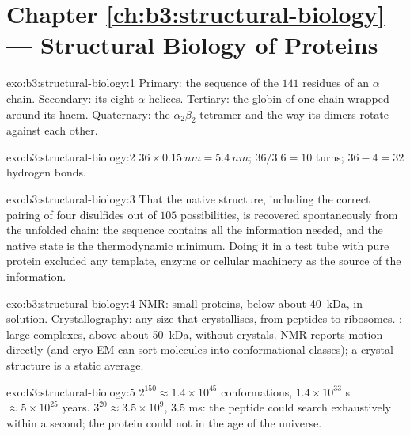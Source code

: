\section*{Chapter \ref{ch:b3:structural-biology} --- Structural Biology of Proteins}

\begin{solution}{exo:b3:structural-biology:1}
Primary: the sequence of the $141$ residues of an $\alpha$ chain.
Secondary: its eight $\alpha$-helices. Tertiary: the globin  of one
chain wrapped around its haem. Quaternary: the $\alpha_{2}\beta_{2}$
tetramer and the way its dimers rotate against each other.
\end{solution}

\begin{solution}{exo:b3:structural-biology:2}
$36\times \qty{0.15}{nm} = \qty{5.4}{nm}$; $36/3.6 = 10$ turns;
$36 - 4 = 32$ hydrogen bonds.
\end{solution}

\begin{solution}{exo:b3:structural-biology:3}
That the native structure, including the correct pairing of four
disulfides out of $105$ possibilities, is recovered spontaneously from
the unfolded chain: the sequence contains all the information needed,
and the native state is the thermodynamic minimum. Doing it in a test
tube with pure protein excluded any template, enzyme or cellular
machinery as the source of the information.
\end{solution}

\begin{solution}{exo:b3:structural-biology:4}
NMR: small proteins, below about \qty{40}{kDa}, in solution.
Crystallography: any size that crystallises, from peptides to
ribosomes. : large complexes, above about
\qty{50}{kDa}, without crystals. NMR reports motion directly (and
cryo-EM can sort molecules into conformational classes); a crystal
structure is a static average.
\end{solution}

\begin{solution}{exo:b3:structural-biology:5}
$2^{150} \approx 1.4\times 10^{45}$ conformations, $1.4\times 10^{33}$
s $\approx 5\times 10^{25}$ years. $3^{20} \approx 3.5\times 10^{9}$,
$3.5$ ms: the peptide could search exhaustively within a second; the
protein could not in the age of the universe.
\end{solution}

